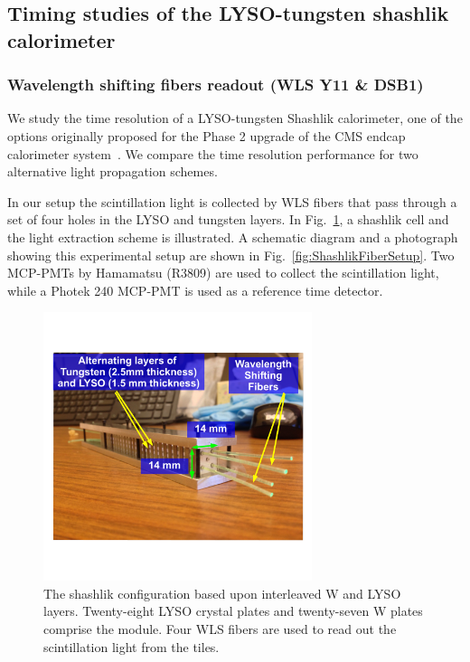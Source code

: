 \subsection{Timing studies of the LYSO-tungsten shashlik calorimeter}
\subsubsection{Wavelength shifting fibers readout (WLS Y11 \& DSB1)}
We study the time resolution of a LYSO-tungsten Shashlik calorimeter, one of the
options originally proposed for the Phase 2 upgrade of the CMS endcap calorimeter
system~\cite{Contardo:1605208}. We compare the time resolution performance for
two alternative light propagation schemes. 

In our setup the scintillation light is collected by WLS fibers that
pass through a set of four holes in the LYSO and tungsten layers. In 
Fig.~\ref{fig:ShashlikDiagram}, a shashlik cell and the light extraction 
scheme is illustrated. A schematic diagram and a photograph showing this experimental
setup are shown in Fig.~\ref{fig:ShashlikFiberSetup}. Two MCP-PMTs  by 
Hamamatsu (R3809) are used to collect the scintillation light, while a Photek 240 
MCP-PMT is used as a reference time detector. 

\begin{figure}[H] \centering
\includegraphics[width=0.7\textwidth]{figs/timing/ShashlikCellPhoto.pdf} 
\caption{ The shashlik configuration based upon interleaved W and LYSO layers. 
Twenty-eight LYSO crystal plates and twenty-seven W plates comprise the module.
Four WLS fibers are used to read out the scintillation light from the 
tiles. } 
\label{fig:ShashlikDiagram}
\end{figure}

